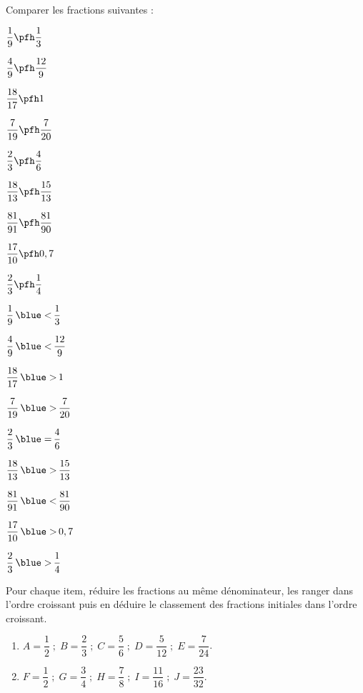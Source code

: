 \begin{colonne*exercice}
\medskip

\begin{exercice} %
   Comparer les fractions suivantes : \medskip
   \begin{colenumerate}{3}
      \item $\dfrac{1}{9} \pfh \dfrac{1}{3}$ \bigskip
      \item $\dfrac{4}{9} \pfh \dfrac{12}{9}$ \bigskip
      \item $\dfrac{18}{17} \pfh 1$ \bigskip
      \item $\dfrac{7}{19} \pfh \dfrac{7}{20}$
      \item $\dfrac{2}{3} \pfh \dfrac{4}{6}$
      \item $\dfrac{18}{13} \pfh \dfrac{15}{13}$
      \item $\dfrac{81}{91} \pfh \dfrac{81}{90}$
      \item $\dfrac{17}{10} \pfh 0,7$
      \item $\dfrac{2}{3} \pfh \dfrac{1}{4}$
   \end{colenumerate}
\end{exercice}

\begin{corrige}
   \begin{colenumerate}{3}
      \item $\dfrac{1}{9} \, {\blue <} \, \dfrac{1}{3}$ \smallskip
      \item $\dfrac{4}{9} \, {\blue <} \,\dfrac{12}{9}$ \smallskip
      \item $\dfrac{18}{17} \, {\blue >} \,1$
      \item $\dfrac{7}{19} \, {\blue >} \,\dfrac{7}{20}$
      \item $\dfrac{2}{3} \, {\blue =} \,\dfrac{4}{6}$
      \item $\dfrac{18}{13} \, {\blue >} \,\dfrac{15}{13}$
      \item $\dfrac{81}{91} \, {\blue <} \,\dfrac{81}{90}$
      \item $\dfrac{17}{10} \, {\blue >} \,0,7$
      \item $\dfrac{2}{3} \, {\blue >} \,\dfrac{1}{4}$
   \end{colenumerate}
\end{corrige}

\medskip

\begin{exercice} %
   Pour chaque item, réduire les fractions au même dénominateur, les ranger dans l'ordre croissant puis en déduire le classement des fractions initiales dans l'ordre croissant. \medskip
   \begin{enumerate}
      \item $A =\dfrac12 \; ; \; B =\dfrac23 \; ; \; C =\dfrac56 \; ; \; D = \dfrac5{12} \; ; \; E =\dfrac7{24}$. \bigskip
      \item $F =\dfrac12 \; ; \; G =\dfrac34 \; ; \; H =\dfrac78 \; ; \; I = \dfrac{11}{16} \; ; \; J =\dfrac{23}{32}$.
   \end{enumerate}
\end{exercice}


\end{colonne*exercice}
